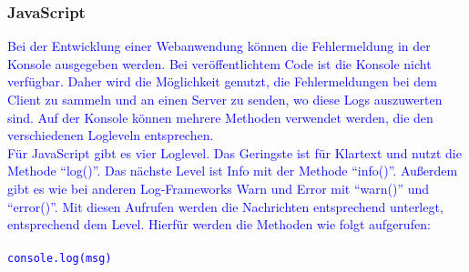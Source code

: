 \subsubsection{JavaScript}\label{subsubsec:javascript}
\textcolor{blue}{
    Bei der Entwicklung einer Webanwendung können die Fehlermeldung in der Konsole ausgegeben werden.
    Bei veröffentlichtem Code ist die Konsole nicht verfügbar.
    Daher wird die Möglichkeit genutzt, die Fehlermeldungen bei dem Client zu sammeln und an einen Server zu senden, wo diese Logs auszuwerten sind.
    Auf der Konsole können mehrere Methoden verwendet werden, die den verschiedenen Logleveln entsprechen.
    \\
    Für JavaScript gibt es vier Loglevel.
    Das Geringste ist für Klartext und nutzt die Methode \enquote{log()}.
    Das nächste Level ist Info mit der Methode \enquote{info()}.
    Außerdem gibt es wie bei anderen Log-Frameworks Warn und Error mit \enquote{warn()} und \enquote{error()}.
    Mit diesen Aufrufen werden die Nachrichten entsprechend unterlegt, entsprechend dem Level.
    Hierfür werden die Methoden wie folgt aufgerufen:
    \\
    \\
    \hspace*{10mm}
    \texttt{console.log(msg)}
}\autocite{stackify}

